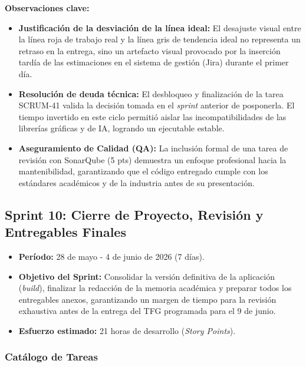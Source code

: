 
\noindent\textbf{Observaciones clave:}
\begin{itemize}
    \item \textbf{Justificación de la desviación de la línea ideal:} El desajuste visual entre la línea roja de trabajo real y la línea gris de tendencia ideal no representa un retraso en la entrega, sino un artefacto visual provocado por la inserción tardía de las estimaciones en el sistema de gestión (Jira) durante el primer día.
    \item \textbf{Resolución de deuda técnica:} El desbloqueo y finalización de la tarea SCRUM-41 valida la decisión tomada en el \textit{sprint} anterior de posponerla. El tiempo invertido en este ciclo permitió aislar las incompatibilidades de las librerías gráficas y de IA, logrando un ejecutable estable.
    \item \textbf{Aseguramiento de Calidad (QA):} La inclusión formal de una tarea de revisión con SonarQube (5 pts) demuestra un enfoque profesional hacia la mantenibilidad, garantizando que el código entregado cumple con los estándares académicos y de la industria antes de su presentación.
\end{itemize}

\subsection{Sprint 10: Cierre de Proyecto, Revisión y Entregables Finales}

\begin{itemize}
    \item \textbf{Período:} 28 de mayo - 4 de junio de 2026 (7 días).
    \item \textbf{Objetivo del Sprint:} Consolidar la versión definitiva de la aplicación (\textit{build}), finalizar la redacción de la memoria académica y preparar todos los entregables anexos, garantizando un margen de tiempo para la revisión exhaustiva antes de la entrega del TFG programada para el 9 de junio.
    \item \textbf{Esfuerzo estimado:} 21 horas de desarrollo (\textit{Story Points}).
\end{itemize}

\subsubsection{Catálogo de Tareas}

